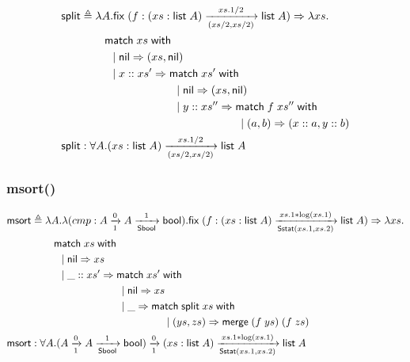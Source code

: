 \documentclass{article}
\newcommand{\arrow}[4]{#1\xrightarrow[#3]{#2}#4}
\newcommand{\symmatch}{\mathsf{match}}
\newcommand{\symwith}{\mathsf{\;with\;}}
\newcommand{\symlist}{\mathsf{list}}
\newcommand{\symnil}{\mathsf{nil}}
\newcommand{\symfix}{\mathsf{fix}}
\newcommand{\symbool}{\mathsf{bool}}
\newcommand{\symmerge}{\mathsf{merge}}
\newcommand{\intro}[2]{(#1 : #2)}
\newcommand{\symSbool}{\mathsf{Sbool}}
\newcommand{\symmsort}{\mathsf{msort}}
\newcommand{\symSstat}{\mathsf{Sstat}}
\newcommand{\symsplit}{\mathsf{split}}
\newcommand{\defeq}{\triangleq}
\begin{document}
\begin{align*}
\symsplit &\defeq \lambda A. \symfix\;(f:\arrow{\intro{xs}{\symlist\;A}}{xs.1/2}{(xs/2,xs/2)}{\symlist\;A})\Rightarrow\lambda xs. \\
& \hspace{0.3in} \symmatch\;xs\symwith \\
& \hspace{.4in} |\; \symnil\Rightarrow (xs,\symnil) \\
& \hspace{.4in} |\; x::xs' \Rightarrow \symmatch\;xs'\symwith \\
& \hspace{1.2in} |\; \symnil\Rightarrow (xs,\symnil) \\
& \hspace{1.2in} |\; y::xs'' \Rightarrow \symmatch\; f\;xs'' \symwith \\
& \hspace{2in} |\; (a, b) \Rightarrow (x::a,y::b) \\
\symsplit &: \forall A.\arrow{\intro{xs}{\symlist\;A}}{xs.1/2}{(xs/2,xs/2)}{\symlist\;A}
\end{align*}

\subsubsection{msort()}

\begin{align*}
\symmsort &\defeq \lambda A. \lambda (cmp:\arrow{A}{0}{1}{\arrow{A}{1}{\symSbool}{\symbool}}).\symfix\;(f:\arrow{\intro{xs}{\symlist\;A}}{xs.1*\log(xs.1)}{\symSstat(xs.1,xs.2)}{\symlist\;A})\Rightarrow\lambda xs. \\
& \hspace{0.3in} \symmatch\;xs\symwith \\
& \hspace{.4in} |\; \symnil\Rightarrow xs \\
& \hspace{.4in} |\; \_::xs' \Rightarrow \symmatch\;xs'\symwith \\
& \hspace{1.2in} |\; \symnil\Rightarrow xs \\
& \hspace{1.2in} |\; \_ \Rightarrow \symmatch\; \symsplit\;xs \symwith \\
& \hspace{1.8in} |\; (ys, zs) \Rightarrow \symmerge\;(f\;ys)\;(f\;zs) \\
\symmsort &: \forall A.\arrow{(\arrow{A}{0}{1}{\arrow{A}{1}{\symSbool}{\symbool}})}{0}{1}{\arrow{\intro{xs}{\symlist\;A}}{xs.1*\log(xs.1)}{\symSstat(xs.1,xs.2)}{\symlist\;A}}
\end{align*}
\end{document}
